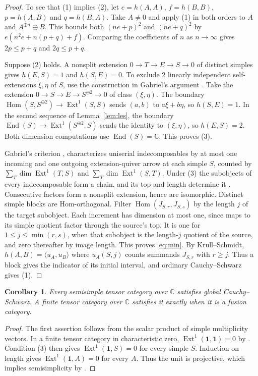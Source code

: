 \documentclass[11pt,reqno]{amsart}
\newtheorem{corollary}[theorem]{Corollary}
\theoremstyle{definition}
\newcommand{\Hom}{\operatorname{Hom}}
\newcommand{\End}{\operatorname{End}}
\newcommand{\Ext}{\operatorname{Ext}}
\newcommand{\one}{\mathbf 1}
\newcommand{\CC}{\mathbb C}
\begin{document}
\begin{proof}
To see that (1) implies (2), let $e=h(A,A)$, $f=h(B,B)$,
$p=h(A,B)$ and $q=h(B,A)$. Take $A\ne0$ and apply (1) in both orders
to $A$ and $A^{\oplus n}\oplus B$. This bounds both $(ne+p)^2$ and
$(ne+q)^2$ by $e(n^2e+n(p+q)+f)$. Comparing the coefficients of $n$
as $n\to\infty$ gives $2p\le p+q$ and $2q\le p+q$.

Suppose (2) holds. A nonsplit extension
$0\to T\to E\to S\to0$ of distinct simples gives
$h(E,S)=1$ and $h(S,E)=0$. To exclude 2 linearly independent
self-extensions $\xi,\eta$ of $S$, use the construction in Gabriel's
argument \cite[proof of Theorem~1.7.1]{CK}. Take the extension
$0\to S\to E\to S^{\oplus2}\to0$ of class $(\xi,\eta)$.
The boundary $\Hom(S,S^{\oplus2})\to\Ext^1(S,S)$ sends
$(a,b)$ to $a\xi+b\eta$, so $h(S,E)=1$. In the second sequence of Lemma~\ref{lem:les}, the boundary
$\End(S)\to\Ext^1(S^{\oplus2},S)$ sends the identity to
$(\xi,\eta)$, so $h(E,S)=2$. Both dimension computations use
$\End(S)=\CC$. This proves (3).

Gabriel's criterion \cite[Theorem~1.7.1]{CK}, \cite[Theorems~7--8]{Eriksen} characterizes uniserial indecomposables by at most one incoming and one outgoing extension-quiver arrow at each simple $S$, counted by $\sum_T\dim\Ext^1(T,S)$ and $\sum_T\dim\Ext^1(S,T)$. Under (3) the subobjects of every indecomposable form a chain, and its top and length determine it \cite[Lemma~1.7.3]{CK}. Consecutive factors form a nonsplit extension, hence are isomorphic. Distinct simple blocks are Hom-orthogonal. Filter $\Hom(J_{S,r},J_{S,s})$ by the length $j$ of the target subobject. Each increment has dimension at most one, since maps to its simple quotient factor through the source's top. It is one for $1\le j\le\min(r,s)$, when that subobject is the length-$j$ quotient of the source, and zero thereafter by image length. This proves \eqref{eq:min}. By Krull--Schmidt, $h(A,B)=\langle u_A,u_B\rangle$ where $u_A(S,j)$ counts summands $J_{S,r}$ with $r\ge j$. Thus a block gives the indicator of its initial interval, and ordinary Cauchy--Schwarz gives (1).
\end{proof}

\begin{corollary}\label{cor:finite-global}
Every semisimple tensor category over $\CC$ satisfies global
Cauchy--Schwarz. A finite tensor category over $\CC$ satisfies it
exactly when it is a fusion category.
\end{corollary}
\begin{proof}
The first assertion follows from the scalar product of simple
multiplicity vectors. In a finite tensor category in characteristic zero,
$\Ext^1(\one,\one)=0$ by \cite[Theorem~4.4.1]{EGNO}.
Condition (3) then gives $\Ext^1(\one,S)=0$ for every simple $S$.
Induction on length gives $\Ext^1(\one,A)=0$ for every $A$.
Thus the unit is projective, which implies semisimplicity by
\cite[Corollary~4.2.13]{EGNO}.
\end{proof}
\end{document}
